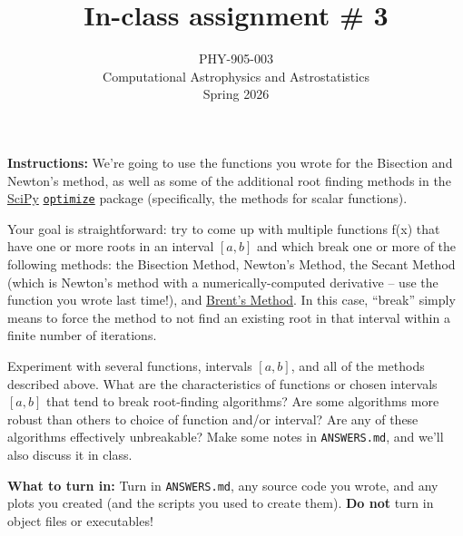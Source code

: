\documentclass[10pt]{article}
\title{In-class assignment \# 3}
\author{PHY-905-003\\Computational Astrophysics and
  Astrostatistics\\Spring 2026}
\date{} %
\begin{document}
 
\maketitle

\vspace{-5mm}

\noindent \textbf{Instructions:} We're going to use the functions you
wrote for the Bisection and Newton's method, as well as some of the
additional root finding methods in the
\href{https://docs.scipy.org}{SciPy}
\href{https://docs.scipy.org/doc/scipy/reference/optimize.html#root-finding}{\texttt{optimize}}
package (specifically, the methods for scalar functions).

Your goal is straightforward: try to come up with multiple functions
f(x) that have one or more roots in an interval $[a,b]$ and which
break one or more of the following methods: the Bisection Method,
Newton's Method, the Secant Method (which is Newton's method with a
numerically-computed derivative -- use the function you wrote 
last time!), and
\href{http://mathworld.wolfram.com/BrentsMethod.html}{Brent's Method}.
In this case, ``break'' simply means to force the method to not find
an existing root in that interval within a finite number of iterations.

Experiment with several functions, intervals $[a,b]$, and all of the methods described
above.  What are the characteristics of functions or chosen intervals
$[a,b]$ that tend to break root-finding algorithms?  Are some
algorithms more robust than others to choice of function and/or interval?  Are any of these algorithms
effectively unbreakable?  Make some notes in \texttt{ANSWERS.md}, and
we'll also discuss it in class.

\vspace{5mm}

\noindent 
\textbf{What to turn in:} Turn in \texttt{ANSWERS.md}, any
source code you wrote, and any plots you created (and the scripts you used
to create them).  \textbf{Do not} turn in object files or
executables!
\end{document}
